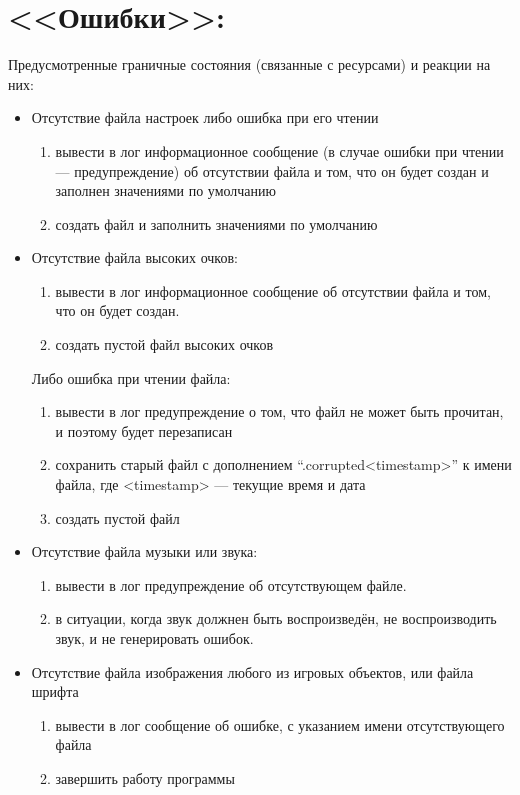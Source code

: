 \documentclass[12pt,a4paper]{article}
\begin{document}
\section{<<Ошибки>>:}
Предусмотренные граничные состояния (связанные с ресурсами) и реакции на них:
\begin{itemize}
\item Отсутствие файла настроек либо ошибка при его чтении
  \begin{enumerate}
  \item вывести в лог информационное сообщение (в случае ошибки при чтении --- предупреждение) об отсутствии файла и том, что он будет создан и заполнен значениями по умолчанию
  \item создать файл и заполнить значениями по умолчанию
  \end{enumerate}
\item Отсутствие файла высоких очков:
  \begin{enumerate}
  \item вывести в лог информационное сообщение об отсутствии файла и том, что он будет создан.
  \item создать пустой файл высоких очков
  \end{enumerate}
  Либо ошибка при чтении файла:
  \begin{enumerate}
  \item вывести в лог предупреждение о том, что файл не может быть прочитан, и поэтому будет перезаписан
  \item сохранить старый файл с дополнением ``.corrupted<timestamp>'' к имени файла, где <timestamp> --- текущие время и дата
  \item создать пустой файл
  \end{enumerate}
\item Отсутствие файла музыки или звука:
  \begin{enumerate}
  \item вывести в лог предупреждение об отсутствующем файле.
  \item в ситуации, когда звук должнен быть воспроизведён, не воспроизводить звук, и не генерировать ошибок.
  \end{enumerate}
\item Отсутствие файла изображения любого из игровых объектов, или файла шрифта
  \begin{enumerate}
  \item вывести в лог сообщение об ошибке, с указанием имени отсутствующего файла
  \item завершить работу программы
  \end{enumerate}
\end{itemize}
\end{document}
